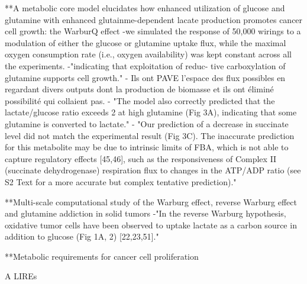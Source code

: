 \documentclass[11pt,a4paper]{article}
\begin{document}
**A metabolic core model elucidates how enhanced utilization of glucose and glutamine with enhanced glutainme-dependent lacate production promotes cancer cell growth: the WarburQ effect
-we simulated the response of 50,000 wirings to a modulation of either the glucose or glutamine uptake flux, while the maximal oxygen consumption rate (i.e., oxygen availability) was kept constant across all the experiments.
-"indicating that exploitation of reduc-
tive carboxylation of glutamine supports cell growth."
- Ils ont PAVE l'espace des flux possibles en regardant divers outputs dont la production de biomasse et ils ont éliminé possibilité qui collaient pas.
- "The model also correctly predicted that the lactate/glucose ratio exceeds 2 at high glutamine (Fig 3A), indicating that some glutamine is converted to lactate."
- "Our prediction of a decrease in succinate level did not match the experimental result (Fig 3C). The inaccurate prediction for this metabolite may be due to intrinsic limits of FBA, which is not able to capture regulatory effects [45,46], such as the responsiveness of Complex II (succinate dehydrogenase) respiration flux to changes in the ATP/ADP ratio (see S2 Text for a more accurate but complex tentative prediction)."

**Multi-scale computational study of the Warburg effect, reverse Warburg effect and glutamine addiction in solid tumors
-"In the reverse Warburg hypothesis, oxidative tumor cells
have been observed to uptake lactate as a carbon source in addition to glucose (Fig 1A, 2)
[22,23,51]."

**Metabolic requirements for cancer cell proliferation

A LIREs
\end{document}
